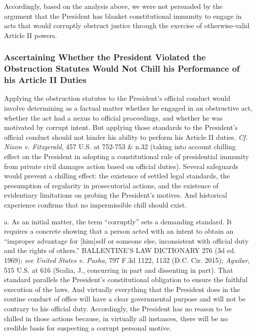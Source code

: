 Accordingly, based on the analysis above, we were not persuaded by the argument that the President has blanket constitutional immunity to engage in acts that would corruptly obstruct justice through the exercise of otherwise-valid Article II powers.%

\subsubsection{Ascertaining Whether the President Violated the Obstruction Statutes Would Not Chill his Performance of his Article II Duties}

Applying the obstruction statutes to the President’s official conduct would involve determining as a factual matter whether he engaged in an obstructive act, whether the act had a nexus to official proceedings, and whether he was motivated by corrupt intent.
But applying those standards to the President’s official conduct should not hinder his ability to perform his Article II duties.
\textit{Cf. Nixon v. Fitzgerald}, 457 U.S. at 752-753 \& n.32 (taking into account chilling effect on the President in adopting a constitutional rule of presidential immunity from private civil damages action based on official duties).
Several safeguards would prevent a chilling effect: the existence of settled legal standards, the presumption of regularity in prosecutorial actions, and the existence of evidentiary limitations on probing the President’s motives.
And historical experience confirms that no impermissible chill should exist.

a. As an initial matter, the term “corruptly” sets a demanding standard.
It requires a concrete showing that a person acted with an intent to obtain an “improper advantage for [him]self or someone else, inconsistent with official duty and the rights of others.” BALLENTINE’S LAW DICTIONARY 276 (3d ed. 1969);
\textit{see United States v. Pasha}, 797 F.3d 1122, 1132 (D.C. Cir. 2015);
\textit{Aguilar}, 515 U.S. at 616 (Scalia, J., concurring in part and dissenting in part).
That standard parallels the President’s constitutional obligation to ensure the faithful execution of the laws.
And virtually everything that the President does in the routine conduct of office will have a clear governmental purpose and will not be contrary to his official duty.
Accordingly, the President has no reason to be chilled in those actions because, in virtually all instances, there will be no credible basis for suspecting a corrupt personal motive.

